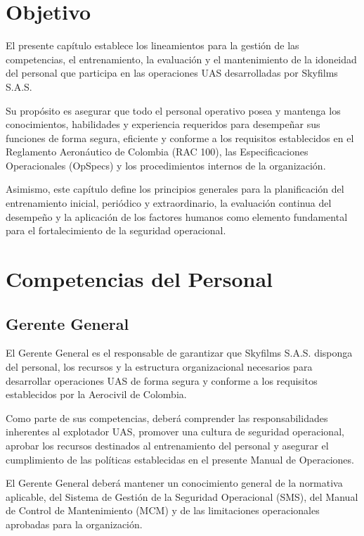 
\section{Objetivo}
\label{inicio_cap4}

El presente capítulo establece los lineamientos para la gestión de las competencias, el entrenamiento, la evaluación y el mantenimiento de la idoneidad del personal que participa en las operaciones UAS desarrolladas por Skyfilms S.A.S.

Su propósito es asegurar que todo el personal operativo posea y mantenga los conocimientos, habilidades y experiencia requeridos para desempeñar sus funciones de forma segura, eficiente y conforme a los requisitos establecidos en el Reglamento Aeronáutico de Colombia (RAC 100), las Especificaciones Operacionales (OpSpecs) y los procedimientos internos de la organización.

Asimismo, este capítulo define los principios generales para la planificación del entrenamiento inicial, periódico y extraordinario, la evaluación continua del desempeño y la aplicación de los factores humanos como elemento fundamental para el fortalecimiento de la seguridad operacional.

\section{Competencias del Personal}

\subsection{Gerente General}


El Gerente General es el responsable de garantizar que Skyfilms S.A.S. disponga del personal, los recursos y la estructura organizacional necesarios para desarrollar operaciones UAS de forma segura y conforme a los requisitos establecidos por la Aerocivil de Colombia.

Como parte de sus competencias, deberá comprender las responsabilidades inherentes al explotador UAS, promover una cultura de seguridad operacional, aprobar los recursos destinados al entrenamiento del personal y asegurar el cumplimiento de las políticas establecidas en el presente Manual de Operaciones.

El Gerente General deberá mantener un conocimiento general de la normativa aplicable, del Sistema de Gestión de la Seguridad Operacional (SMS), del Manual de Control de Mantenimiento (MCM) y de las limitaciones operacionales aprobadas para la organización.



